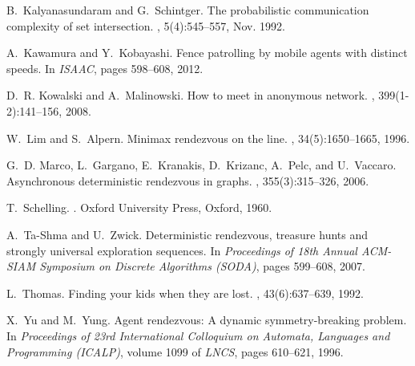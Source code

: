 \documentclass{llncs}
\begin{document}
\begin{thebibliography}{10}
B.~Kalyanasundaram and G.~Schintger.
\newblock The probabilistic communication complexity of set intersection.
, 5(4):545--557, Nov. 1992.

A.~Kawamura and Y.~Kobayashi.
\newblock Fence patrolling by mobile agents with distinct speeds.
\newblock In {\em ISAAC}, pages 598--608, 2012.

D.~R. Kowalski and A.~Malinowski.
\newblock How to meet in anonymous network.
, 399(1-2):141--156, 2008.

W.~Lim and S.~Alpern.
\newblock Minimax rendezvous on the line.
, 34(5):1650--1665,
  1996.

G.~D. Marco, L.~Gargano, E.~Kranakis, D.~Krizanc, A.~Pelc, and U.~Vaccaro.
\newblock Asynchronous deterministic rendezvous in graphs.
, 355(3):315--326, 2006.

T.~Schelling.
.
\newblock Oxford University Press, Oxford, 1960.

A.~Ta-Shma and U.~Zwick.
\newblock Deterministic rendezvous, treasure hunts and strongly universal
  exploration sequences.
\newblock In {\em Proceedings of 18th Annual {ACM}-SIAM Symposium on Discrete
  Algorithms ({SODA})}, pages 599--608, 2007.

L.~Thomas.
\newblock Finding your kids when they are lost.
, 43(6):637--639,
  1992.

X.~Yu and M.~Yung.
\newblock Agent rendezvous: {A} dynamic symmetry-breaking problem.
\newblock In {\em Proceedings of 23rd International Colloquium on Automata,
  Languages and Programming ({ICALP})}, volume 1099 of {\em LNCS}, pages
  610--621, 1996.

\end{thebibliography}
\end{document}
